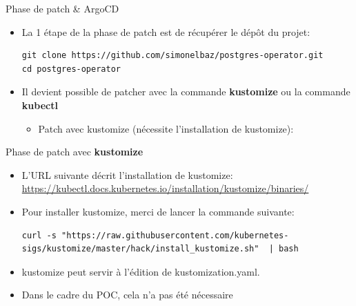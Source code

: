 
\begin{frame}[fragile]{Phase de patch \& ArgoCD}

\begin{itemize}
   \item La 1\iere{} étape de la phase de patch est de récupérer le dépôt du projet:
\begin{tiny}
\begin{Verbatim}[commandchars=\&\@\@]
git clone https://github.com/simonelbaz/postgres-operator.git
cd postgres-operator
\end{Verbatim}
\end{tiny}
   \item Il devient possible de patcher avec la commande \textbf{kustomize} ou la commande \textbf{kubectl}
   \begin{itemize}
         \item Patch avec kustomize (nécessite l'installation de kustomize):
   \end{itemize}
\end{itemize}

\end{frame}


\begin{frame}[fragile]{Phase de patch avec \textbf{kustomize}}

\begin{itemize}
   \item L'URL suivante décrit l'installation de kustomize: \url{https://kubectl.docs.kubernetes.io/installation/kustomize/binaries/}
   \item Pour installer kustomize, merci de lancer la commande suivante:
      \begin{tiny}
      \begin{Verbatim}[commandchars=\&\{\}]
curl -s "https://raw.githubusercontent.com/kubernetes-sigs/kustomize/master/hack/install_kustomize.sh"  | bash
      \end{Verbatim}
      \end{tiny}
   \item kustomize peut servir à l'édition de kustomization.yaml.
   \item Dans le cadre du POC, cela n'a pas été nécessaire
\end{itemize}

\end{frame}

